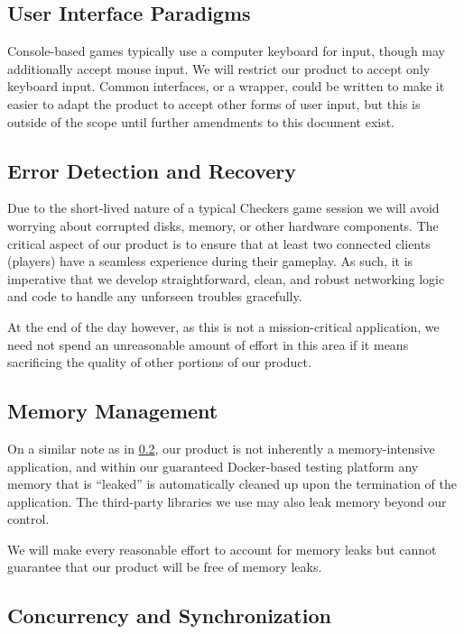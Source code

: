 \documentclass[letterpaper]{article}
\begin{document}
\subsection{User Interface Paradigms}
\label{sec:strategies_ui}

Console-based games typically use a computer keyboard for input,
though may additionally accept mouse input. We will restrict our
product to accept only keyboard input. Common interfaces, or a
wrapper, could be written to make it easier to adapt the product
to accept other forms of user input, but this is outside of the
scope until further amendments to this document exist.

\subsection{Error Detection and Recovery}
\label{sec:strategies_recovery}

Due to the short-lived nature of a typical Checkers game session
we will avoid worrying about corrupted disks, memory, or other
hardware components. The critical aspect of our product is to
ensure that at least two connected clients (players) have a
seamless experience during their gameplay. As such, it is
imperative that we develop straightforward, clean, and robust
networking logic and code to handle any unforseen troubles
gracefully.

At the end of the day however, as this is not a mission-critical
application, we need not spend an unreasonable amount of effort
in this area if it means sacrificing the quality of other
portions of our product.

\subsection{Memory Management}
\label{sec:strategies_memory}

On a similar note as in \cref{sec:strategies_recovery}, our
product is not inherently a memory-intensive application, and
within our guaranteed Docker-based testing platform any memory
that is ``leaked'' is automatically cleaned up upon the
termination of the application. The third-party libraries we use
may also leak memory beyond our control.

We will make every reasonable effort to account for memory leaks
but cannot guarantee that our product will be free of memory
leaks.

\subsection{Concurrency and Synchronization}
\label{sec:strategies_concurrency}
\end{document}
